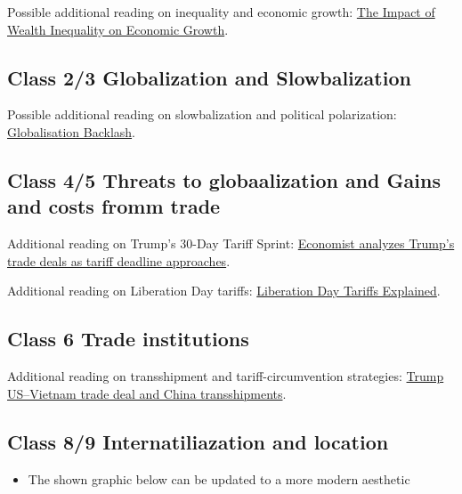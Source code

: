 \documentclass[
  11pt,
]{article}
\providecommand{\tightlist}{%
  \setlength{\itemsep}{0pt}\setlength{\parskip}{0pt}}
\begin{document}
Possible additional reading on inequality and economic growth:
\href{https://cepr.org/voxeu/columns/impact-wealth-inequality-economic-growth-evidence-italy-during-its-structural}{The
Impact of Wealth Inequality on Economic Growth}.

\subsection{Class 2/3 Globalization and
Slowbalization}\label{class-23-globalization-and-slowbalization}

Possible additional reading on slowbalization and political
polarization:
\href{https://cepr.org/voxeu/columns/globalisation-backlash}{Globalisation
Backlash}.

\subsection{Class 4/5 Threats to globaalization and Gains and costs
fromm
trade}\label{class-45-threats-to-globaalization-and-gains-and-costs-fromm-trade}

Additional reading on Trump's 30-Day Tariff Sprint:
\href{https://www.pbs.org/newshour/show/economist-analyzes-trumps-trade-deals-as-tariff-deadline-approaches}{Economist
analyzes Trump's trade deals as tariff deadline approaches}.

Additional reading on Liberation Day tariffs:
\href{https://www.csis.org/analysis/liberation-day-tariffs-explained\#:~:text=In\%20a\%20Rose\%20Garden\%20event,place\%20a\%20universal\%2010\%20percent}{Liberation
Day Tariffs Explained}.

\subsection{Class 6 Trade
institutions}\label{class-6-trade-institutions}

Additional reading on transshipment and tariff-circumvention strategies:
\href{https://time.com/7300087/trump-us-vietnam-trade-deal-china-transshipments/}{Trump
US--Vietnam trade deal and China transshipments}.

\subsection{Class 8/9 Internatiliazation and
location}\label{class-89-internatiliazation-and-location}

\begin{itemize}
\tightlist
\item
  The shown graphic below can be updated to a more modern aesthetic
\end{itemize}
\end{document}
